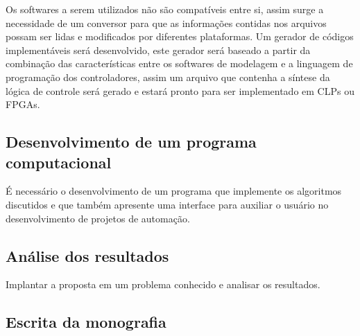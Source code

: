Os softwares a serem utilizados n\~ao s\~ao compat\'iveis entre si, assim surge a necessidade de um conversor para que as informa\c{c}\~oes contidas nos arquivos possam ser lidas e modificados por diferentes plataformas. Um gerador de c\'odigos implement\'aveis ser\'a desenvolvido, este gerador ser\'a baseado a partir da combina\c{c}\~ao das caracter\'isticas entre os softwares de modelagem e a linguagem de programa\c{c}\~ao dos controladores, assim um arquivo que contenha a s\'intese da l\'ogica de controle ser\'a gerado e estar\'a pronto para ser implementado em CLPs ou FPGAs.

\subsection{Desenvolvimento de um programa computacional}

\'E necess\'ario o desenvolvimento de um programa que implemente os algoritmos discutidos e que tamb\'em apresente uma interface para auxiliar o usu\'ario no desenvolvimento de projetos de automa\c{c}\~ao.

\subsection{An\'alise dos resultados}

Implantar a proposta em um problema conhecido e analisar os resultados.



\subsection{Escrita da monografia}

